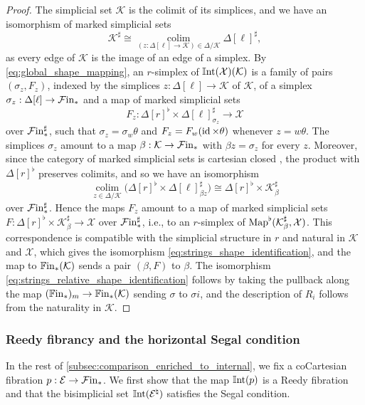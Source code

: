 \documentclass[10pt,reqno]{amsart}
\begin{document}
\begin{proof}
The simplicial set $\mathcal K$ is the colimit of its simplices, and
we have an isomorphism of marked simplicial sets
\[
 \mathcal K^\sharp\cong
 \operatorname*{colim}_{(z:\Delta[\ell]\to\mathcal K)\in\Delta/\mathcal K}
 \Delta[\ell]^\sharp,
\]
as every edge of $\mathcal K$ is the image of an edge of a simplex.
By \eqref{eq:global_shape_mapping}, an $r$-simplex of
$\mathbb{I}\mathrm{nt}(\mathcal X)(\mathcal K)$ is a family of pairs
$(\sigma_z,F_z)$, indexed by the simplices
$z:\Delta[\ell]\to\mathcal K$ of $\mathcal K$, of a simplex
$\sigma_z:\Delta[\ell]\to\mathcal{F}\mathrm{in}_*$ and a map of marked simplicial
sets
\[
 F_z:\Delta[r]^\flat\times
 \Delta[\ell]^\sharp_{\sigma_z}\longrightarrow \mathcal X
\]
over $\mathcal{F}\mathrm{in}_*^\sharp$, such that $\sigma_z=\sigma_w\theta$ and
$F_z=F_w(\operatorname{id}\times\theta)$ whenever $z=w\theta$. The simplices
$\sigma_z$ amount to a map $\beta:\mathcal K\to \mathcal{F}\mathrm{in}_*$ with
$\beta z=\sigma_z$ for every $z$. Moreover, since the category of
marked simplicial sets is cartesian closed
\cite[\S3.1.3]{lurie2009higher}, the product with $\Delta[r]^\flat$
preserves colimits, and so we have an isomorphism
\[
 \operatorname*{colim}_{z\in\Delta/\mathcal K}
 \bigl(\Delta[r]^\flat\times
 \Delta[\ell]^\sharp_{\beta z}\bigr)
 \cong\Delta[r]^\flat\times \mathcal K^\sharp_\beta
\]
over $\mathcal{F}\mathrm{in}_*^\sharp$. Hence the maps $F_z$ amount to a map of
marked simplicial sets
$F:\Delta[r]^\flat\times \mathcal K^\sharp_\beta\to \mathcal X$ over
$\mathcal{F}\mathrm{in}_*^\sharp$, i.e., to an $r$-simplex of
$\operatorname{Map}^\flat(\mathcal K^\sharp_\beta,\mathcal X)$. This correspondence
is compatible with the simplicial structure in $r$ and natural in
$\mathcal K$ and $\mathcal X$, which gives the isomorphism
\eqref{eq:strings_shape_identification}, and the map to
$\mathbb{F}\mathrm{in}_*(\mathcal K)$ sends a pair $(\beta,F)$ to $\beta$. The
isomorphism \eqref{eq:strings_relative_shape_identification} follows by
taking the pullback along the map
$(\mathbb{F}\mathrm{in}_*)_m\to\mathbb{F}\mathrm{in}_*(\mathcal K)$ sending $\sigma$ to
$\sigma i$, and the description of $R_i$ follows from the
naturality in $\mathcal K$.
\end{proof}

\subsubsection{Reedy fibrancy and the horizontal Segal condition}

\label{subsubsec:relative_reedy}

In the rest of \cref{subsec:comparison_enriched_to_internal}, we fix a
coCartesian fibration $p:\mathcal E\to \mathcal{F}\mathrm{in}_*$. We first show that
the map $\mathbb{I}\mathrm{nt}(p)$ is
a Reedy fibration and that the bisimplicial set
$\mathbb{I}\mathrm{nt}(\mathcal E^\natural)$ satisfies the Segal condition.
\end{document}
